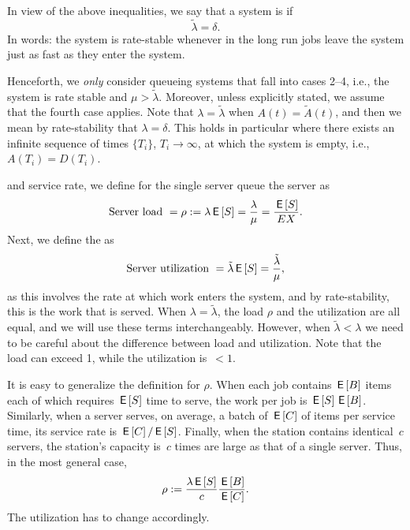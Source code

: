 \documentclass[stochastic-or.tex]{subfiles}
\begin{document}
In view of the above inequalities, we say that a system is  if
\begin{equation*}
\tilde \lambda = \delta.
\end{equation*}
In words: the system is rate-stable whenever in the long run jobs leave the system just as fast as they enter the system.

Henceforth, we \emph{only} consider queueing systems that fall into cases 2--4, i.e., the system is rate stable and $\mu > \tilde \lambda$.
Moreover, unless explicitly stated, we assume that the fourth case applies.
Note that $\lambda = \tilde \lambda$ when $A(t) = \tilde A(t)$, and then we mean by rate-stability that $\lambda = \delta$.
This holds in particular where there exists an infinite sequence of times $\{T_i\}$,  $T_i\to\infty$, at which the system is empty, i.e., $A(T_i) = D(T_i)$.



 and service rate, we define for the single server queue the server  as
\begin{equation*}
\textrm{Server load } = \rho :=  \lambda \,\mathsf{E}\left[S\right]=\frac{\lambda}{\mu} = \frac{\,\mathsf{E}\left[S\right]}{E X}.
\end{equation*}
Next, we define the  as
\begin{equation*}
\textrm{Server utilization } = \tilde \lambda \,\mathsf{E}\left[S\right] = \frac{\tilde \lambda}{\mu},
\end{equation*}
as this involves the rate at which work enters the system, and by rate-stability, this is the work that is served.
When $\lambda = \tilde \lambda$,  the load $\rho$ and the utilization are all equal, and we will use these terms interchangeably.
However, when $\tilde \lambda < \lambda$  we need to be careful about the difference between load and utilization.
Note that the load can exceed 1, while the utilization is~$< 1$.


It is  easy to generalize the definition for $\rho$.
When each job contains $\,\mathsf{E}\left[B\right]$ items each of which requires $\,\mathsf{E}\left[S\right]$ time to serve, the work per job is $\,\mathsf{E}\left[S\right] \,\mathsf{E}\left[B\right]$.
Similarly, when a server serves, on average, a batch of $\,\mathsf{E}\left[C\right]$ of items per service time, its service rate is $\,\mathsf{E}\left[C\right]/\,\mathsf{E}\left[S\right]$.
Finally, when the station contains identical~$c$ servers, the station's capacity is~$c$ times are large as that of a single server.
Thus, in the most general case,
\begin{equation*}
\rho := \frac{\lambda \,\mathsf{E}\left[S\right]}c \frac{\,\mathsf{E}\left[B\right]}{\,\mathsf{E}\left[C\right]}.
\end{equation*}
The utilization has to change accordingly.
\end{document}
